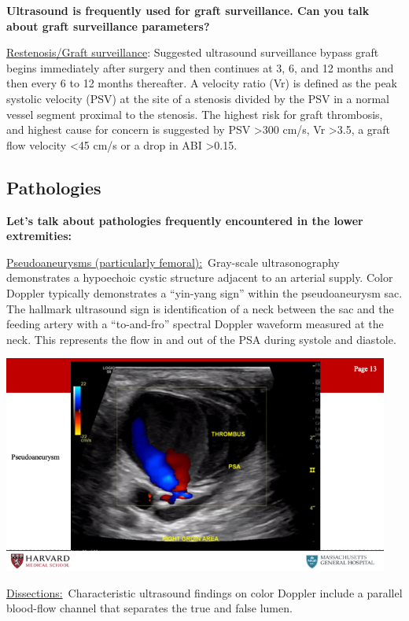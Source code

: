 \documentclass[
]{book}
\begin{document}
\textbf{Ultrasound is frequently used for graft surveillance. Can you talk
about graft surveillance parameters?}

\underline{Restenosis/Graft surveillance}: Suggested ultrasound surveillance
bypass graft begins immediately after surgery and then continues at 3,
6, and 12 months and then every 6 to 12 months thereafter. A velocity
ratio (Vr) is defined as the peak systolic velocity (PSV) at the site of
a stenosis divided by the PSV in a normal vessel segment proximal to the
stenosis. The highest risk for graft thrombosis, and highest cause for
concern is suggested by PSV \textgreater300 cm/s, Vr \textgreater3.5, a graft flow velocity
\textless45 cm/s or a drop in ABI \textgreater0.15.\citep{bandykHemodynamicsVeinGraft1988}

\hypertarget{pathologies}{%
\subsection{Pathologies}\label{pathologies}}

\textbf{Let's talk about pathologies frequently encountered in the lower
extremities:}

\underline{Pseudoaneurysms (particularly femoral):}~Gray-scale
ultrasonography demonstrates a hypoechoic cystic structure adjacent to
an arterial supply. Color Doppler typically demonstrates a ``yin-yang
sign'' within the pseudoaneurysm sac. The hallmark ultrasound sign is
identification of a neck between the sac and the feeding artery with a
``to-and-fro'' spectral Doppler waveform measured at the neck. This
represents the flow in and out of the PSA during systole and diastole.

\includegraphics[width=5in]{images/vasc_lab/Slide14}

\underline{Dissections:}~Characteristic ultrasound findings on color Doppler
include a parallel blood-flow channel that separates the true and false
lumen.
\end{document}
